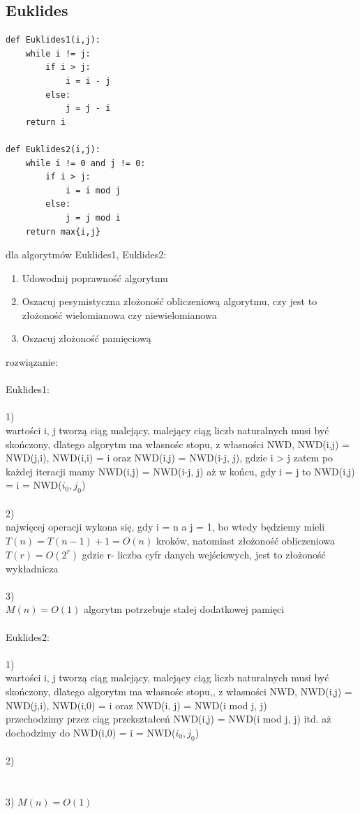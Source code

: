 \documentclass{article}
\begin{document}
\subsection*{Euklides}
\begin{lstlisting}
def Euklides1(i,j):
	while i != j:
		if i > j:
			i = i - j
		else:
			j = j - i
	return i

def Euklides2(i,j):
	while i != 0 and j != 0:
		if i > j:
			i = i mod j
		else:
			j = j mod i
	return max{i,j}

\end{lstlisting}

dla algorytmów Euklides1, Euklides2:
\begin{enumerate}
	\item Udowodnij poprawność algorytmu
	\item Oszacuj pesymistyczna złożoność obliczeniową algorytmu, czy jest to złożoność wielomianowa czy niewielomianowa
	\item Oszacuj złożoność pamięciową
\end{enumerate}
rozwiązanie:\\
\\ Euklides1:\\\\
1)\\ 
wartości i, j tworzą ciąg malejący,  malejący ciąg liczb naturalnych musi być skończony, dlatego algorytm ma własnośc stopu,
z własności NWD, NWD(i,j) = NWD(j,i), NWD(i,i) = i oraz NWD(i,j) = NWD(i-j, j), gdzie i > j zatem po każdej iteracji mamy
NWD(i,j) = NWD(i-j, j) aż w końcu, gdy i = j to NWD(i,j) = i = NWD($i_0,j_0$) \\\\
2)\\
najwięcej operacji wykona się,  gdy i = n a j = 1, bo wtedy będziemy mieli $T(n) = T(n-1) + 1 = O(n)$ kroków, 
natomiast złożoność obliczeniowa $T(r) = O(2^r)$ gdzie r- liczba cyfr danych wejściowych, jest to złożoność wykładnicza \\\\
3)\\
$M(n) = O(1)$ algorytm potrzebuje stałej dodatkowej pamięci \\\\
Euklides2: \\\\
1)\\
wartości i, j tworzą ciąg malejący,  malejący ciąg liczb naturalnych musi być skończony, dlatego algorytm ma własnośc stopu,, 
z własności NWD, NWD(i,j) = NWD(j,i), NWD(i,0) = i oraz NWD(i, j) = NWD(i mod j, j) \\
przechodzimy przez ciąg przekształceń NWD(i,j) = NWD(i mod j, j) itd.  aż dochodzimy do NWD(i,0) = i = NWD($i_0, j_0$) \\\\
2)\\
\\\\
3)
$M(n) = O(1)$
\end{document}
